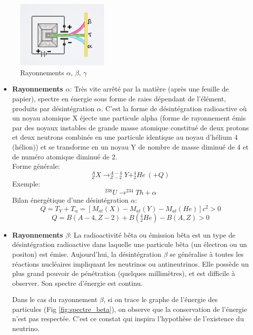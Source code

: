 \begin{figure}[ht]
    \centering
    \includegraphics[width=0.4\textwidth]{Images1/rayonnements.PNG}
    \caption{Rayonnements $\alpha$, $\beta$, $\gamma$}
    \label{fig:alpha_beta_gamma}
\end{figure}

\begin{itemize}
    \item \textbf{Rayonnements $\alpha$}: Très vite arrêté par la matière (après une feuille de papier), spectre en énergie sous forme de raies dépendant de l'élément, produits par désintégration $\alpha$. C'est la forme de désintégration radioactive où un noyau atomique X éjecte une particule alpha (forme de rayonnement émis par des noyaux instables de grande masse atomique constitué de deux protons et deux neutrons combinés en une particule identique au noyau d'hélium 4 (hélion)) et se transforme en un noyau Y  de nombre de masse diminué de 4 et de numéro atomique diminué de 2. \\
    Forme générale:
    \[
        ^{A}_{Z}X \longrightarrow ^{A-4}_{Z-2}Y + ^{4}_{2} He ~ (+Q)
    \]
    Exemple:
    \[
        ^{238}U \longrightarrow ^{234}Th + \alpha
    \]
    Bilan énergétique d'une désintégration $\alpha$:
    \[
        Q = T_Y + T_\alpha = [M_{at}(X)-M_{at}(Y)-M_{at}(He)]c^2>0
    \]
    \[
        Q=B(A-4,Z-2)+B(^{4}_{2}He)-B(A,Z)>0
    \]

    \item \textbf{Rayonnements $\beta$}: La radioactivité bêta ou émission bêta est un type de désintégration radioactive dans laquelle une particule bêta (un électron ou un positon) est émise. Aujourd'hui, la désintégration $\beta$ se généralise à toutes les réactions nucléaires impliquant les neutrinos ou antineutrinos. Elle possède un plus grand pouvoir de pénétration (quelques millimètres), et est difficile à observer. Son spectre d'énergie est continu.

    Dans le cas du rayonnement $\beta$, si on trace le graphe de l'énergie des particules (Fig \ref{fig:spectre_beta}), on observe que la conservation de l'énergie n'est pas respectée. C'est ce constat qui inspira l'hypothèse de l'existence du neutrino.


\end{itemize}
